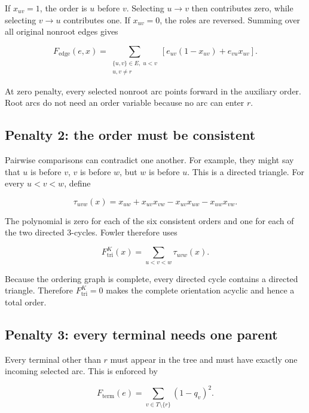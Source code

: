 \documentclass[10pt,a4paper]{article}
\begin{document}
If $x_{uv}=1$, the order is $u$ before $v$. Selecting $u\to v$ then contributes
zero, while selecting $v\to u$ contributes one. If $x_{uv}=0$, the roles are
reversed. Summing over all original nonroot edges gives

\begin{equation}
F_{\mathrm{edge}}(e,x)=
\sum_{\substack{\{u,v\}\in E,\;u<v\\u,v\neq r}}
\left[e_{uv}(1-x_{uv})+e_{vu}x_{uv}\right].
\label{eq:edge-order}
\end{equation}

At zero penalty, every selected nonroot arc points forward in the auxiliary
order. Root arcs do not need an order variable because no arc can enter $r$.

\subsection{Penalty 2: the order must be consistent}

Pairwise comparisons can contradict one another. For example, they might say
that $u$ is before $v$, $v$ is before $w$, but $w$ is before $u$. This is a
directed triangle. For every $u<v<w$, define

\begin{equation}
\tau_{uvw}(x)=
x_{uw}+x_{uv}x_{vw}-x_{uv}x_{uw}-x_{uw}x_{vw}.
\label{eq:triangle}
\end{equation}

The polynomial is zero for each of the six consistent orders and one for each
of the two directed 3-cycles. Fowler therefore uses

\begin{equation}
F_{\mathrm{tri}}^{K}(x)=\sum_{u<v<w}\tau_{uvw}(x).
\label{eq:full-triangle}
\end{equation}

Because the ordering graph is complete, every directed cycle contains a
directed triangle. Therefore $F_{\mathrm{tri}}^{K}=0$ makes the complete
orientation acyclic and hence a total order.

\subsection{Penalty 3: every terminal needs one parent}

Every terminal other than $r$ must appear in the tree and must have exactly
one incoming selected arc. This is enforced by

\begin{equation}
F_{\mathrm{term}}(e)=
\sum_{v\in T\setminus\{r\}}(1-q_v)^2.
\label{eq:terminal}
\end{equation}
\end{document}
